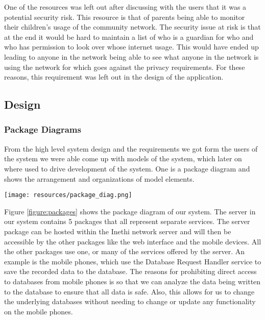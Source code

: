 One of the resources was left out after discussing with the users that it was a potential security risk.
This resource is that of parents being able to monitor their children's usage of the community network.
The security issue at risk is that at the end it would be hard to maintain a list of who is a guardian for who and who has permission to look over whose internet usage.
This would have ended up leading to anyone in the network being able to see what anyone in the network is using the network for which goes against the privacy requirements.
For these reasons, this requirement was left out in the design of the application.
\subsection{Design}\label{subsec:design}
\subsubsection{Package Diagrams}
From the high level system design and the requirements we got form the users of the system we were able come up with models of the system, which later on where used to drive development of the system.
One is a package diagram and shows the arrangement and organizations of model elements.
\begin{figure*}
    \begin{center}
        \texttt{[image: resources/package\_diag.png]}
    \end{center}
    \caption{Showing UML package diagrams of the system.}
    \label{figure:packages}
\end{figure*}
Figure \ref{figure:packages} shows the package diagram of our system.
The server in our system contains 5 packages that all represent separate services.
The server package can be hosted within the Inethi network server and will then be accessible by the other packages like the web interface and the mobile devices.
All the other packages use one, or many of the services offered by the server.
An example is the mobile phones, which use the Database Request Handler service to save the recorded data to the database.
The reasons for prohibiting direct access to databases from mobile phones is so that we can analyze the data being written to the database to ensure that all data is safe.
Also, this allows for us to change the underlying databases without needing to change or update any functionality on the mobile phones.

